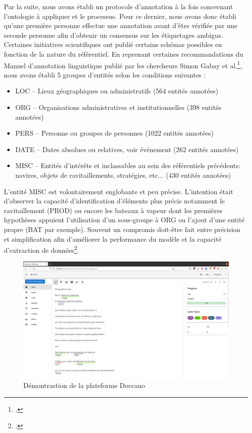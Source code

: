     Par la suite, nous avons établi un protocole d'annotation à la fois concernant l'ontologie à appliquer et le processus. Pour ce dernier, nous avons donc établi qu'une première personne effectue une annotation avant d'être vérifiée par une seconde personne afin d'obtenir un consensus sur les étiquetages ambigus.
    Certaines initiatives scientifiques ont publié certains schémas possibles en fonction de la nature du référentiel. En reprenant certaines recommandations du Manuel d’annotation linguistique publié par les chercheurs Simon Gabay et al.\footcite{gabayManuelAnnotationLinguistique2022}, nous avons établi 5 groupes d'entités selon les conditions suivantes :
    \begin{itemize}
        \item LOC -- Lieux géographiques ou administratifs (564 entités annotées)
        \item ORG -- Organisations administratives et institutionnelles (398 entités annotées)
        \item PERS -- Personne ou groupes de personnes (1022 entités annotées)
        \item DATE -- Dates absolues ou relatives, voir événement (262 entités annotées)
        \item MISC -- Entités d'intérêts et inclassables au sein des référentiels précédents: navires, objets de ravitaillements, stratégies, etc... (430 entités annotées)
    \end{itemize}
    
    L'entité MISC est volontairement englobante et peu précise. L'intention était d'observer la capacité d'identification d'éléments plus précis notamment le ravitaillement (PROD) ou encore les bateaux à vapeur dont les premières hypothèses appuient l'utilisation d'un sous-groupe à ORG ou l'ajout d'une entité propre (BAT par exemple). Souvent un compromis doit-être fait entre précision et simplification afin d'améliorer la performance du modèle et la capacité d'extraction de données\footcite{grouinSimplificationSchemasAnnotation2018}. 
    
    \begin{figure}[h!]
        \centering
        \includegraphics[width=1\textwidth]{annexes/img/doccano.png}
        \caption{Démontrastion de la plateforme Doccano}
        \label{fig:doccano}
    \end{figure}
    
